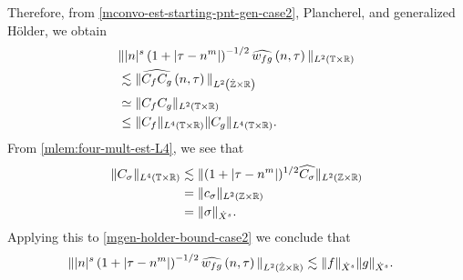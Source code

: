 Therefore, from \eqref{mconvo-est-starting-pnt-gen-case2}, Plancherel, and generalized 
H\"{o}lder, we obtain
%
%
\begin{equation}
	\label{mgen-holder-bound-case2}
	\begin{split}
		& \| |n|^s \left( 1 + | \tau - n^m | \right )^{-1/2}  \widehat{w_{fg}}\left( 
		n, \tau \right) \|_{L^2(\mathbb{T} \times \mathbb{R})}
		\\
		& \lesssim \|\widehat{C_f C_g }\left( n, \tau \right) 
		\|_{L^2\left( \dot{\mathbb{Z}} \times \mathbb{R} \right)}
		\\
		& \simeq \|C_f C_g \|_{L^2\left( \mathbb{T} \times \mathbb{R} \right)}
		\\
		& \le \|C_f \|_{L^4(\mathbb{T} \times \mathbb{R})} \|C_g \|_{L^4(\mathbb{T} \times \mathbb{R})}.
	\end{split}
\end{equation}
%
From \cref{mlem:four-mult-est-L4}, we see that
%
%
\begin{equation}
	\label{mfour-mult-conseq-gen-case2}
	\begin{split}
		\|C_\sigma\|_{L^4(\mathbb{T} \times \mathbb{R})} 
		& \lesssim \|(1 + | \tau - n^m |)^{1/2} \widehat{C_\sigma}
		\|_{L^2(\mathbb{Z} \times \mathbb{R})}
		\\
		& = \|c_{\sigma} \|_{L^2(\mathbb{Z} \times \mathbb{R})} 
		\\
		& = \|\sigma \|_{\dot{X}^s}. 
	\end{split}
\end{equation}
%
%
Applying this to \eqref{mgen-holder-bound-case2} we
conclude that
\begin{equation*}
	\begin{split}
		\| |n|^s \left( 1 + | \tau - n^m | \right ) ^{-1/2} \widehat{w_{fg}}\left( 
		n, \tau \right) \|_{L^2(\dot{\mathbb{Z}} \times \mathbb{R})}
		& \lesssim \|f\|_{\dot{X}^s} \|g\|_{\dot{X}^s}.
	\end{split}
\end{equation*}
%
%
%
